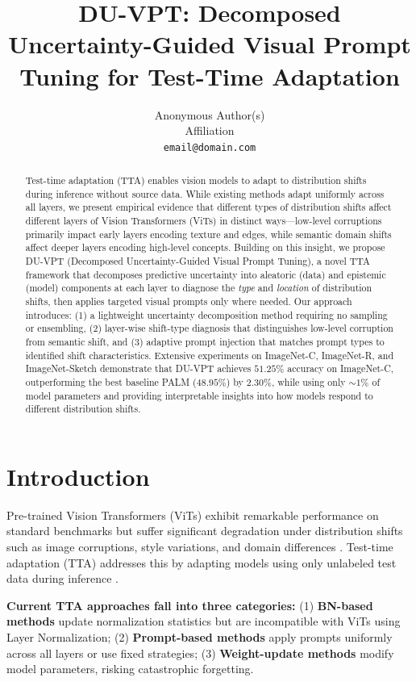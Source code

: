 \documentclass[11pt,a4paper]{article}
\title{DU-VPT: Decomposed Uncertainty-Guided Visual Prompt Tuning for Test-Time Adaptation}
\author{
  Anonymous Author(s) \\
  Affiliation \\
  \texttt{email@domain.com}
}
\begin{document}
\maketitle

\begin{abstract}
Test-time adaptation (TTA) enables vision models to adapt to distribution shifts during inference without source data. While existing methods adapt uniformly across all layers, we present empirical evidence that different types of distribution shifts affect different layers of Vision Transformers (ViTs) in distinct ways---low-level corruptions primarily impact early layers encoding texture and edges, while semantic domain shifts affect deeper layers encoding high-level concepts. Building on this insight, we propose DU-VPT (Decomposed Uncertainty-Guided Visual Prompt Tuning), a novel TTA framework that decomposes predictive uncertainty into aleatoric (data) and epistemic (model) components at each layer to diagnose the \textit{type} and \textit{location} of distribution shifts, then applies targeted visual prompts only where needed. Our approach introduces: (1) a lightweight uncertainty decomposition method requiring no sampling or ensembling, (2) layer-wise shift-type diagnosis that distinguishes low-level corruption from semantic shift, and (3) adaptive prompt injection that matches prompt types to identified shift characteristics. Extensive experiments on ImageNet-C, ImageNet-R, and ImageNet-Sketch demonstrate that DU-VPT achieves $51.25\%$ accuracy on ImageNet-C, outperforming the best baseline PALM ($48.95\%$) by $2.30\%$, while using only ${\sim}1\%$ of model parameters and providing interpretable insights into how models respond to different distribution shifts.
\end{abstract}

\section{Introduction}

Pre-trained Vision Transformers (ViTs) exhibit remarkable performance on standard benchmarks but suffer significant degradation under distribution shifts such as image corruptions, style variations, and domain differences \citep{dosovitskiy2021image}. Test-time adaptation (TTA) addresses this by adapting models using only unlabeled test data during inference \citep{wang2021tent}.

\textbf{Current TTA approaches fall into three categories:} (1) \textbf{BN-based methods} \citep{wang2021tent, niu2022eata} update normalization statistics but are incompatible with ViTs using Layer Normalization; (2) \textbf{Prompt-based methods} \citep{shu2022test, gao2022visual} apply prompts uniformly across all layers or use fixed strategies; (3) \textbf{Weight-update methods} \citep{wang2022continual, maharana2025palm} modify model parameters, risking catastrophic forgetting.
\end{document}
